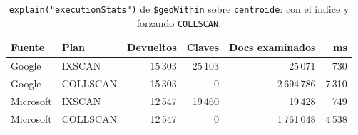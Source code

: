 \begin{table}[H]
\centering\small
\caption{\texttt{explain("executionStats")} de \texttt{\$geoWithin} sobre \texttt{centroide}: con el índice y forzando \texttt{COLLSCAN}.}
\label{tab:explain-geowithin}
\begin{tabular}{@{}llrrrr@{}}
\toprule
\textbf{Fuente} & \textbf{Plan} & \textbf{Devueltos} & \textbf{Claves} & \textbf{Docs examinados} & \textbf{ms} \\
\midrule
Google & IXSCAN & 15\,303 & 25\,103 & 25\,071 & 730 \\
Google & COLLSCAN & 15\,303 & 0 & 2\,694\,786 & 7\,310 \\
Microsoft & IXSCAN & 12\,547 & 19\,460 & 19\,428 & 749 \\
Microsoft & COLLSCAN & 12\,547 & 0 & 1\,761\,048 & 4\,538 \\
\bottomrule
\end{tabular}
\end{table}
